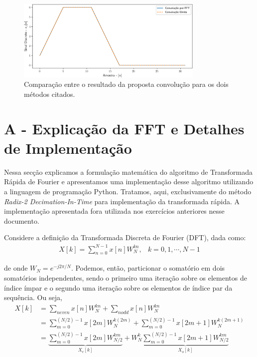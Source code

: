 \documentclass[a4paper,11pt]{article}
\numberwithin{figure}{section}
\numberwithin{equation}{section}
\numberwithin{table}{section}
\theoremstyle{definition}
\begin{document}
\begin{figure}[ht] \centering
	\includegraphics[width=0.8\textwidth]{convVsFourier}
	\caption{Comparação entre o resultado da proposta convolução para os dois métodos citados.}
	\label{fig:convVsFourier}
\end{figure}

\clearpage
\section*{A - Explicação da FFT e Detalhes de Implementação}

Nessa secção explicamos a formulação matemática do algoritmo de Transformada Rápida de Fourier e apresentamos uma implementação desse algoritmo utilizando a linguagem de programação Python. Tratamos, aqui, exclusivamente do método \textit{Radix-2 Decimation-In-Time} para implementação da transformada rápida. A implementação apresentada fora utilizada nos exercícios anteriores nesse documento.

Considere a definição da Transformada Discreta de Fourier (DFT), dada como:
\begin{equation} \label{eq:dft}
\begin{matrix}
	X[k] = \displaystyle\sum_{n = 0}^{N-1} x[n] W_N^{kn}, & k = 0, 1, \cdots, N-1
\end{matrix}
\end{equation}

\noindent de onde $W_N = e^{-j2\pi / N}$. Podemos, então, particionar o somatório em dois somatórios independentes, sendo o primeiro uma iteração sobre os elementos de índice ímpar e o segundo uma iteração sobre os elementos de índice par da sequência. Ou seja,
\begin{equation} \label{eq:fft02}
\begin{split}
	X[k] &= \sum_{n even} x[n] W_N^{kn} + \sum_{n odd} x[n] W_N^{kn} \\
		 &= \sum_{m = 0}^{(N/2)-1} x[2m] W_N^{k(2m)} + \sum_{m = 0}^{(N/2)-1} x[2m+1] W_N^{k(2m+1)} \\
		 &= \underbrace{\sum_{m = 0}^{(N/2)-1} x[2m] W_{N/2}^{km}}_{X_e[k]} + W_N^{k} \underbrace{\sum_{m = 0}^{(N/2)-1} x[2m+1] W_{N/2}^{km}}_{X_o[k]}
\end{split}
\end{equation}
\end{document}
